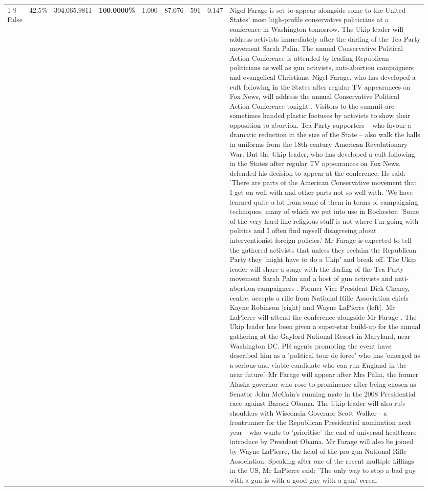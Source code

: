 \begin{table}[H]
\begin{tabular}{lllrlllll}
\cline{1-9} \cline{2-9}
False & 42.5\% & \color{red} 304,065.9811 & \bfseries \color{red} 100.0000\% & 1.000 & 87.076 & 591 & 0.147 & Nigel Farage is set to appear alongside some to the United States' most high-profile conservative politicians at a conference in Washington tomorrow. The Ukip leader will address activists immediately after the darling of the Tea Party movement Sarah Palin. The annual Conservative Political Action Conference is attended by leading Republican politicians as well as gun activists, anti-abortion campaigners and evangelical Christians. Nigel Farage, who has developed a cult following in the States after regular TV appearances on Fox News, will address the annual Conservative Political Action Conference tonight . Visitors to the summit are sometimes handed plastic foetuses by activists to show their opposition to abortion. Tea Party supporters – who favour a dramatic reduction in the size of the State – also walk the halls in uniforms from the 18th-century American Revolutionary War. But the Ukip leader, who has developed a cult following in the States after regular TV appearances on Fox News, defended his decision to appear at the conference. He said: 'There are parts of the American Conservative movement that I get on well with and other parts not so well with. 'We have learned quite a lot from some of them in terms of campaigning techniques, many of which we put into use in Rochester. 'Some of the very hard-line religious stuff is not where I'm going with politics and I often find myself disagreeing about interventionist foreign policies.' Mr Farage is expected to tell the gathered activists that unless they reclaim the Republican Party they 'might have to do a Ukip' and break off. The Ukip leader will share a stage with the darling of the Tea Party movement Sarah Palin and a host of gun activists and anti-abortion campaigners . Former Vice President Dick Cheney, centre, accepts a rifle from National Rifle Association chiefs Kayne Robinson (right) and Wayne LaPierre (left). Mr LaPierre will attend the conference alongside Mr Farage . The Ukip leader has been given a super-star build-up for the annual gathering at the Gaylord National Resort in Maryland, near Washington DC. PR agents promoting the event have described him as a 'political tour de force' who has 'emerged as a serious and viable candidate who can run England in the near future'. Mr Farage will appear after Mrs Palin, the former Alaska governor who rose to prominence after being chosen as Senator John McCain's running mate in the 2008 Presidential race against Barack Obama. The Ukip leader will also rub shoulders with Wisconsin Governor Scott Walker - a frontrunner for the Republican Presidential nomination next year - who wants to 'prioritise' the end of universal healthcare introduce by President Obama. Mr Farage will also be joined by Wayne LaPierre, the head of the pro-gun National Rifle Association. Speaking after one of the recent multiple killings in the US, Mr LaPierre said: 'The only way to stop a bad guy with a gun is with a good guy with a gun.' cereal \\

\end{tabular}
\end{table}
